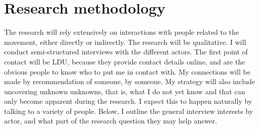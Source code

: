 \documentclass{article}[12pt]
\begin{document}
\section{Research methodology}

The research will rely extensively on interactions with people related to the movement, either directly or indirectly.
The research will be qualitative. I will conduct semi-structured interviews with the different actors. The first point of contact will be LDU, because they provide contact details online, and are the obvious people to know who to put me in contact with. My connections will be made by recommendation of someone, by someone. My strategy will also include uncovering unknown unknowns, that is, what I do not yet know and that can only become apparent during the research. I expect this to happen naturally by talking to a variety of people. Below, I outline the general interview interests by actor, and what part of the research question they may help answer.
\end{document}
